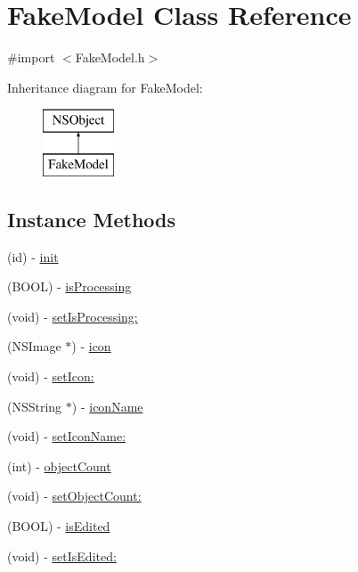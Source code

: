 \hypertarget{interface_fake_model}{\section{Fake\-Model Class Reference}
\label{interface_fake_model}
}


{\ttfamily \#import $<$Fake\-Model.\-h$>$}

Inheritance diagram for Fake\-Model\-:\begin{figure}[H]
\begin{center}
\leavevmode
\includegraphics[height=2.000000cm]{interface_fake_model}
\end{center}
\end{figure}
\subsection*{Instance Methods}
\begin{DoxyCompactItemize}
\item 
(id) -\/ \hyperlink{interface_fake_model_a4213bb26f5207ee3f402fe463badc691}{init}
\item 
(B\-O\-O\-L) -\/ \hyperlink{interface_fake_model_a35b114a9b06641dc54da77d2da7912db}{is\-Processing}
\item 
(void) -\/ \hyperlink{interface_fake_model_a76ea620e950e4295ab51a3c3d6763bf0}{set\-Is\-Processing\-:}
\item 
(N\-S\-Image $\ast$) -\/ \hyperlink{interface_fake_model_a25a1b868f9a16962195270197f564cd3}{icon}
\item 
(void) -\/ \hyperlink{interface_fake_model_ac7571b155476c2ac4e59ef40cc37b12e}{set\-Icon\-:}
\item 
(N\-S\-String $\ast$) -\/ \hyperlink{interface_fake_model_a17af947f2cd88dcdd4e4bd4bc2c5b6a1}{icon\-Name}
\item 
(void) -\/ \hyperlink{interface_fake_model_ae7afea97ceda20e65ccc14062a61a104}{set\-Icon\-Name\-:}
\item 
(int) -\/ \hyperlink{interface_fake_model_a7da483d5900b9d04c9a53461a5d706f5}{object\-Count}
\item 
(void) -\/ \hyperlink{interface_fake_model_a5099a75736cad8bdb0fdb332496d25da}{set\-Object\-Count\-:}
\item 
(B\-O\-O\-L) -\/ \hyperlink{interface_fake_model_a58586b06830e1e249ab772a3a594c31c}{is\-Edited}
\item 
(void) -\/ \hyperlink{interface_fake_model_acd73a29b2af0376baa7cf3b475eff838}{set\-Is\-Edited\-:}
\end{DoxyCompactItemize}
